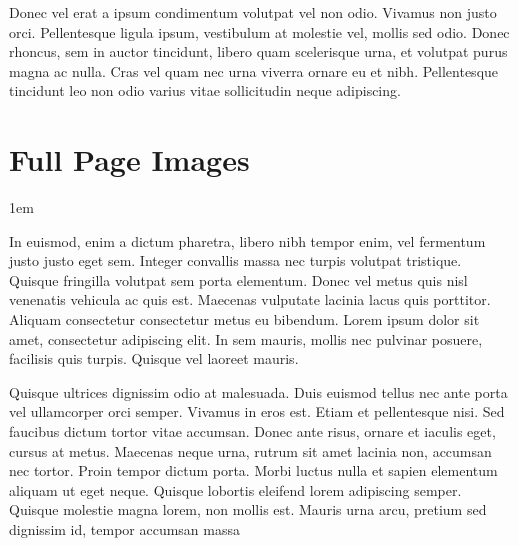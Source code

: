 Donec vel erat a ipsum condimentum volutpat vel non odio. Vivamus non justo orci. Pellentesque ligula ipsum, vestibulum at molestie vel, mollis sed odio. Donec rhoncus, sem in auctor tincidunt, libero quam scelerisque urna, et volutpat purus magna ac nulla. Cras vel quam nec urna viverra ornare eu et nibh. Pellentesque tincidunt leo non odio varius vitae sollicitudin neque adipiscing. 

\section{Full Page Images}

\parindent1em

In euismod, enim a dictum pharetra, libero nibh tempor enim, vel fermentum justo justo eget sem. Integer convallis massa nec turpis volutpat tristique. Quisque fringilla volutpat sem porta elementum. Donec vel metus quis nisl venenatis vehicula ac quis est. Maecenas vulputate lacinia lacus quis porttitor. Aliquam consectetur consectetur metus eu bibendum. Lorem ipsum dolor sit amet, consectetur adipiscing elit. In sem mauris, mollis nec pulvinar posuere, facilisis quis turpis. Quisque vel laoreet mauris.

Quisque ultrices dignissim odio at malesuada. Duis euismod tellus nec ante porta vel ullamcorper orci semper. Vivamus in eros est. Etiam et pellentesque nisi. Sed faucibus dictum tortor vitae accumsan. Donec ante risus, ornare et iaculis eget, cursus at metus. Maecenas neque urna, rutrum sit amet lacinia non, accumsan nec tortor. Proin tempor dictum porta. Morbi luctus nulla et sapien elementum aliquam ut eget neque. Quisque lobortis eleifend lorem adipiscing semper. Quisque molestie magna lorem, non mollis est. Mauris urna arcu, pretium sed dignissim id, tempor accumsan massa



